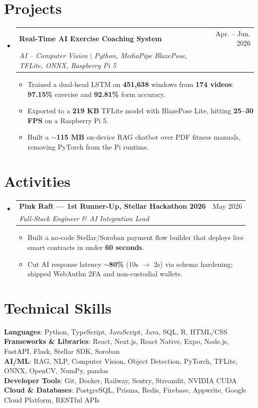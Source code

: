 \documentclass[letterpaper,11pt]{article}
\makeatletter
\newcommand{\resumeItem}[1]{
  \item\small{
    {#1 \vspace{-2pt}}
  }
}
\newcommand{\resumeSubheading}[4]{
  \vspace{-2pt}\item
    \begin{tabular*}{0.97\textwidth}[t]{l@{\extracolsep{\fill}}r}
      \textbf{#1} & #2 \\
      \textit{\small#3} & \textit{\small #4} \\
    \end{tabular*}\vspace{-7pt}
}
\newcommand{\resumeSubHeadingListStart}{\begin{itemize}[leftmargin=0.15in, label={}, itemsep=7pt, topsep=3pt]}
\newcommand{\resumeSubHeadingListEnd}{\end{itemize}}
\newcommand{\resumeItemListStart}{\begin{itemize}[itemsep=3pt, topsep=2pt, parsep=0pt, partopsep=0pt, leftmargin=*]}
\newcommand{\resumeItemListEnd}{\end{itemize}\vspace{-4pt}}
\makeatother
\begin{document}
\section{Projects}
    \resumeSubHeadingListStart

      \resumeSubheading
          {Real-Time AI Exercise Coaching System}{Apr. -- Jun. 2026}
          {AI -- Computer Vision $|$ Python, MediaPipe BlazePose, TFLite, ONNX, Raspberry Pi 5}{}
          \resumeItemListStart
            \resumeItem{Trained a dual-head LSTM on \textbf{451,638} windows from \textbf{174 videos}: \textbf{97.15\%} exercise and \textbf{92.81\%} form accuracy.}
            \resumeItem{Exported to a \textbf{219 KB} TFLite model with BlazePose Lite, hitting \textbf{25--30 FPS} on a Raspberry Pi 5.}
            \resumeItem{Built a \textbf{$\sim$115 MB} on-device RAG chatbot over PDF fitness manuals, removing PyTorch from the Pi runtime.}
          \resumeItemListEnd

    \resumeSubHeadingListEnd


\section{Activities}
    \resumeSubHeadingListStart

      \resumeSubheading
          {Pink Raft --- 1st Runner-Up, Stellar Hackathon 2026}{May 2026}
          {Full-Stack Engineer \& AI Integration Lead}{}
          \resumeItemListStart
            \resumeItem{Built a no-code Stellar/Soroban payment flow builder that deploys live smart contracts in under \textbf{60 seconds}.}
            \resumeItem{Cut AI response latency \textbf{$\sim$80\%} (10s $\to$ 2s) via schema hardening; shipped WebAuthn 2FA and non-custodial wallets.}
          \resumeItemListEnd

    \resumeSubHeadingListEnd


\vspace{-4pt}
\section{Technical Skills}
 \begin{itemize}[leftmargin=0.15in, label={}]
    \small{\item{
     \textbf{Languages}{: Python, TypeScript, JavaScript, Java, SQL, R, HTML/CSS} \\
     \textbf{Frameworks \& Libraries}{: React, Next.js, React Native, Expo, Node.js, FastAPI, Flask, Stellar SDK, Soroban} \\
     \textbf{AI/ML}{: RAG, NLP, Computer Vision, Object Detection, PyTorch, TFLite, ONNX, OpenCV, NumPy, pandas} \\
     \textbf{Developer Tools}{: Git, Docker, Railway, Sentry, Streamlit, NVIDIA CUDA} \\
     \textbf{Cloud \& Databases}{: PostgreSQL, Prisma, Redis, Firebase, Appwrite, Google Cloud Platform, RESTful APIs}
    }}
 \end{itemize}

\end{document}
